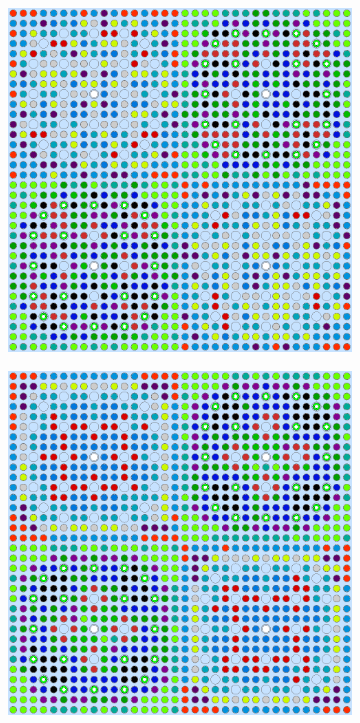 \begin{appendices}
\begin{figure}[h!]
\begin{subfigure}{0.48\textwidth}
  \caption{}
  \label{fig:no-features-assm-2x2-combined-4}
\end{subfigure}
\begin{subfigure}{0.48\textwidth}
  \centering
  \includegraphics[width=0.85\linewidth]{figures/unsupervised/geometries/without-features/8-clusters/pinch/2x2}
  \caption{}
  \label{fig:no-features-assm-2x2-pinch-8}
\end{subfigure}%
\begin{subfigure}{0.48\textwidth}
  \centering
  \includegraphics[width=0.85\linewidth]{figures/unsupervised/geometries/without-features/8-clusters/combined/2x2}

\end{subfigure}
\end{figure}
\end{appendices}
